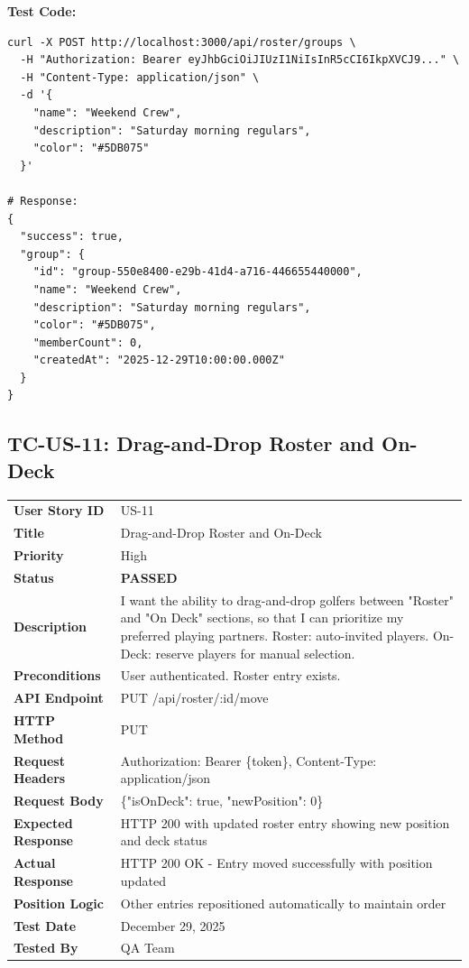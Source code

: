\documentclass[11pt,a4paper]{article}
\newcommand{\passed}{\textcolor{pass}{\textbf{PASSED}}}
\begin{document}
\vspace{0.3cm}
\textbf{Test Code:}
\begin{lstlisting}
curl -X POST http://localhost:3000/api/roster/groups \
  -H "Authorization: Bearer eyJhbGciOiJIUzI1NiIsInR5cCI6IkpXVCJ9..." \
  -H "Content-Type: application/json" \
  -d '{
    "name": "Weekend Crew",
    "description": "Saturday morning regulars",
    "color": "#5DB075"
  }'

# Response:
{
  "success": true,
  "group": {
    "id": "group-550e8400-e29b-41d4-a716-446655440000",
    "name": "Weekend Crew",
    "description": "Saturday morning regulars",
    "color": "#5DB075",
    "memberCount": 0,
    "createdAt": "2025-12-29T10:00:00.000Z"
  }
}
\end{lstlisting}

\vspace{0.5cm}


\subsection{TC-US-11: Drag-and-Drop Roster and On-Deck}

\begin{tabularx}{\textwidth}{|p{3.2cm}|Y|}
\hline
{}
 \\
\hline
\textbf{User Story ID} & US-11 \\
\hline
\textbf{Title} & Drag-and-Drop Roster and On-Deck \\
\hline
\textbf{Priority} & High \\
\hline
\textbf{Status} & \passed \\
\hline
\textbf{Description} & I want the ability to drag-and-drop golfers between "Roster" and "On Deck" sections, so that I can prioritize my preferred playing partners. Roster: auto-invited players. On-Deck: reserve players for manual selection. \\
\hline
\textbf{Preconditions} & User authenticated. Roster entry exists. \\
\hline
\textbf{API Endpoint} & PUT /api/roster/:id/move \\
\hline
\textbf{HTTP Method} & PUT \\
\hline
\textbf{Request Headers} & Authorization: Bearer \{token\}, Content-Type: application/json \\
\hline
\textbf{Request Body} & \{"isOnDeck": true, "newPosition": 0\} \\
\hline
\textbf{Expected Response} & HTTP 200 with updated roster entry showing new position and deck status \\
\hline
\textbf{Actual Response} & HTTP 200 OK - Entry moved successfully with position updated \\
\hline
\textbf{Position Logic} & Other entries repositioned automatically to maintain order \\
\hline
\textbf{Test Date} & December 29, 2025 \\
\hline
\textbf{Tested By} & QA Team \\
\hline
\end{tabularx}
\end{document}
